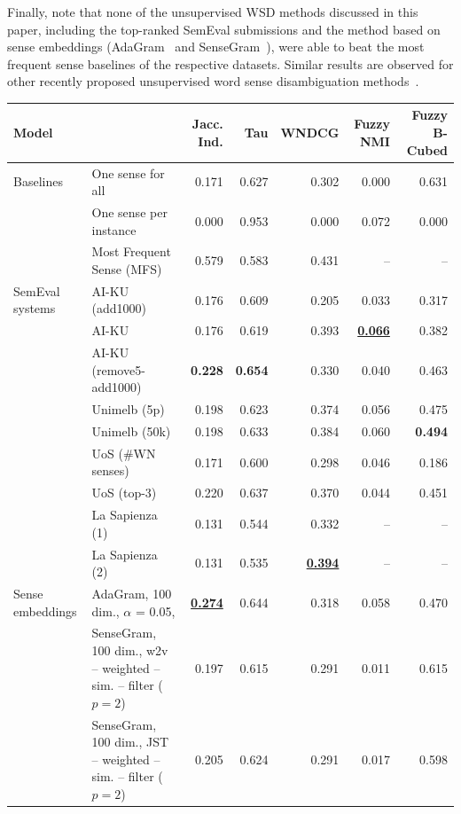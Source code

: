\documentclass[11pt]{article}
\begin{document}
Finally, note that none of the unsupervised WSD methods discussed in this paper, including the top-ranked SemEval submissions and the method based on sense embeddings (AdaGram~\cite{bartunov2015breaking} and SenseGram~\cite{pelevina2016}), were able to beat the most frequent sense baselines of the respective datasets. Similar results are observed for other recently proposed unsupervised word sense disambiguation methods~\cite{nietopina2016}.  

\begin{table}[t]
\scriptsize

\centering
\begin{tabular}{llrrr|rr}
\toprule

 \bf Model &  & \bf Jacc. Ind. & \bf Tau & \bf WNDCG & \bf Fuzzy NMI & \bf Fuzzy B-Cubed \\
\toprule
Baselines & One sense for all & 0.171 & 0.627 & 0.302 & 0.000 & 0.631 \\
& One sense per instance & 0.000 & 0.953 & 0.000 & 0.072 & 0.000 \\
& Most Frequent Sense (MFS) & 0.579 & 0.583 & 0.431 &  -- & -- \\
\toprule

SemEval systems & AI-KU (add1000) & 0.176 & 0.609 & 0.205 & 0.033 & 0.317 \\
& AI-KU & 0.176 & 0.619 & 0.393 & \bf \underline{0.066} & 0.382 \\
& AI-KU (remove5-add1000) & \bf 0.228 & \bf 0.654 & 0.330 & 0.040 & 0.463 \\
& Unimelb (5p) & 0.198 & 0.623 & 0.374 & 0.056 & 0.475 \\
& Unimelb (50k) & 0.198 & 0.633 & 0.384 & 0.060 & \bf 0.494 \\
& UoS (\#WN senses) & 0.171 & 0.600 & 0.298 & 0.046 & 0.186 \\
& UoS (top-3) & 0.220 & 0.637 & 0.370 & 0.044 & 0.451 \\
& La Sapienza (1) & 0.131 & 0.544 & 0.332 & --  & -- \\
& La Sapienza (2) & 0.131 & 0.535 & \bf \underline{0.394} & -- & -- \\
\midrule
Sense embeddings & AdaGram, 100 dim., $\alpha$ = 0.05, & \bf \underline{0.274} & 0.644  & 0.318  & 0.058  & 0.470 \\
& SenseGram, 100 dim., w2v -- weighted -- sim. -- filter ($p=2$) & 0.197 & 0.615 & 0.291 & 0.011 & 0.615 \\
& SenseGram, 100 dim., JST  -- weighted -- sim. -- filter ($p=2$) & 0.205 & 0.624 & 0.291 & 0.017 & 0.598\\
\toprule


\end{tabular}
\end{table}
\end{document}
